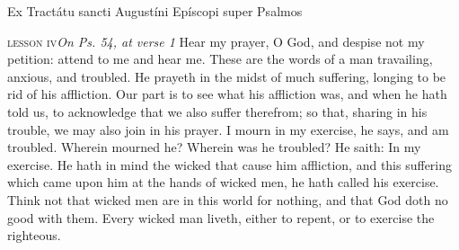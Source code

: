 \mylessonsize
{\begin{center}
Ex Tractátu sancti Augustíni Epíscopi super Psalmos%
\end{center}
\hspace{10ex}\textsc{lesson iv}\hfill\emph{On Ps. 54, at verse 1}\hspace{10ex}
{Hear my prayer, O God, and despise not my petition: attend to me and hear me. These are the words of a man travailing, anxious, and troubled. He prayeth in the midst of much suffering, longing to be rid of his affliction. Our part is to see what his affliction was, and when he hath told us, to acknowledge that we also suffer therefrom; so that, sharing in his trouble, we may also join in his prayer. I mourn in my exercise, he says, and am troubled. Wherein mourned he? Wherein was he troubled? He saith: In my exercise. He hath in mind the wicked that cause him affliction, and this suffering which came upon him at the hands of wicked men, he hath called his exercise. Think not that wicked men are in this world for nothing, and that God doth no good with them. Every wicked man liveth, either to repent, or to exercise the righteous.}
\medskip
}
\vfil

